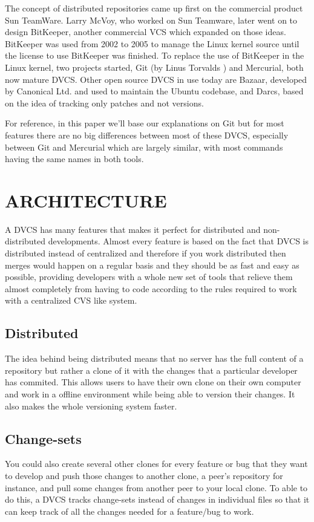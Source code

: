 The concept of distributed repositories came up first on the commercial product 
Sun TeamWare. Larry McVoy, who worked on Sun Teamware, later went 
on to design BitKeeper, another commercial VCS which expanded on those ideas. 
BitKeeper was used from 2002 to 2005 to manage the Linux kernel source until 
the license to use BitKeeper was finished. 
To replace the use of BitKeeper in the Linux kernel, two projects started, Git (by
Linus Torvalds \cite{linusgit}) and Mercurial, both now mature DVCS. 
Other open source DVCS in use today are Bazaar, 
developed by Canonical Ltd. and used to maintain the Ubuntu codebase, and Darcs, based on 
the idea of tracking only patches and not versions.

For reference, in this paper we'll base our explanations on Git but for most features there 
are no big differences between most of these DVCS, especially between Git and Mercurial which are 
largely similar, with most commands having the same names in both tools.


\section{ARCHITECTURE}

A DVCS has many features that makes it perfect for distributed and non-distributed developments. Almost every feature is based on the fact that DVCS is distributed instead of centralized and therefore if you work distributed then merges would happen on a regular basis and they should be as fast and easy as possible, providing developers with a whole new set of tools that relieve them almost completely from having to code according to the rules required to work with a centralized CVS like system. 

\subsection{Distributed}
The idea behind being distributed means that no server has the full content of a repository but rather a clone of it with the changes that a particular developer has commited. This allows users to have their own clone on their own computer and work in a offline environment while being able to version their changes. It also makes the whole versioning system faster.

\subsection{Change-sets}
You could also create several other clones for every feature or bug that they want to develop and push those changes to another clone, a peer's repository for instance, and pull some changes from another peer to your local clone. To able to do this, a DVCS tracks change-sets instead of changes in individual files so that it can keep track of all the changes needed for a feature/bug to work. 

